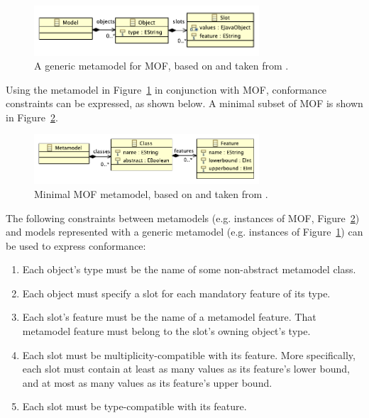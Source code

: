 \begin{figure}[htbp]
  \centering
  \includegraphics[width=3.3in]{5.Implementation/slot_model.pdf}
  \caption[A generic metamodel for MOF]{A generic metamodel for MOF, based on \cite{MOF} and taken from \cite{rose09enhanced}.}
  \label{fig:slot_model}
\end{figure}

Using the metamodel in Figure~\ref{fig:slot_model} in conjunction with MOF, conformance constraints can be expressed, as shown below. A minimal subset of MOF is shown in Figure~\ref{fig:minimal_mof}.

\begin{figure}[htbp]
  \centering
  \includegraphics[width=3.3in]{5.Implementation/mof.pdf}
  \caption[Minimal MOF metamodel]{Minimal MOF metamodel, based on \cite{MOF} and taken from \cite{rose09enhanced}.}
  \label{fig:minimal_mof}
\end{figure}

The following constraints between metamodels (e.g. instances of MOF, Figure~\ref{fig:minimal_mof}) and models represented with a generic metamodel (e.g. instances of Figure~\ref{fig:slot_model}) can be used to express conformance:

\begin{enumerate}
	\item Each object's type must be the name of some non-abstract metamodel class.
	\item Each object must specify a slot for each mandatory feature of its type.
	\item Each slot's feature must be the name of a metamodel feature. That metamodel feature must belong to the slot's owning object's type.
	\item Each slot must be multiplicity-compatible with its feature. More specifically, each slot must contain at least as many values as its feature's lower bound, and at most as many values as its feature's upper bound.
  \item Each slot must be type-compatible with its feature.
\end{enumerate}


